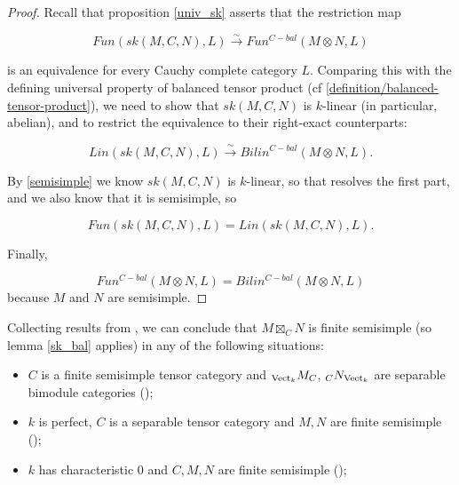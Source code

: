 \begin{proof}
  Recall that proposition \ref{univ_sk} asserts that the restriction map

  \[
   Fun(sk(M,C,N),L) \xrightarrow{\sim} Fun^{C-bal}(M \otimes N,L)
  \]

  is an equivalence for every Cauchy complete category $L$. Comparing this
  with the defining universal property of balanced tensor product
  (cf \ref{definition/balanced-tensor-product}), we need to show that
  $sk(M,C,N)$ is $k$-linear (in particular, abelian), and to restrict the
  equivalence to their right-exact counterparts:

  \[
    Lin(sk(M,C,N),L) \xrightarrow{\sim} Bilin^{C-bal}(M \otimes N, L).
  \]

  By \ref{semisimple} we know $sk(M,C,N)$ is $k$-linear, so that resolves the
  first part, and we also know that it is semisimple, so

  \[
    Fun(sk(M,C,N), L) = Lin(sk(M,C,N), L).
  \]

  Finally,

  \[
    Fun^{C-bal}(M \otimes N, L) = Bilin^{C-bal}(M \otimes N, L)
  \]
  because $M$ and $N$ are semisimple.
\end{proof}

\begin{remark}\label{semisimple_douglas/dualizable-tensor-categories}

  \noindent Collecting results
  from \cite{douglas/dualizable-tensor-categories}, we can conclude that
  $M\boxtimes_C N$ is finite semisimple (so lemma \ref{sk_bal} applies) in any
  of the following situations:

  \begin{itemize}

    \item $C$ is a finite semisimple tensor category and $_{\operatorname{Vect}_k}M_C$,
    $_{C}N_{\operatorname{Vect}_k}$ are separable bimodule categories (\cite[Proposition
    2.5.3, Theorem 2.5.5]{douglas/dualizable-tensor-categories});

    \item $k$ is perfect, $C$ is a separable tensor category and $M,N$ are
    finite semisimple (\cite[Proposition
    2.5.10]{douglas/dualizable-tensor-categories});

    \item $k$ has characteristic $0$ and $C,M,N$ are finite semisimple
    (\cite[Corollary 2.6.9]{douglas/dualizable-tensor-categories});

  \end{itemize}
\end{remark}

